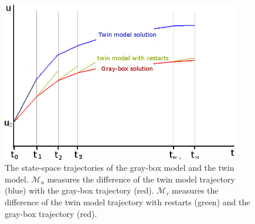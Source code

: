 \begin{figure}[htbp]\begin{center}
    \includegraphics[height=7cm]{../sketch2.png}
    \caption{The state-space trajectories of the gray-box model and the twin model. 
             $\mathcal{M}_u$ measures the difference of the twin model trajectory (blue) with
             the gray-box trajectory (red). $\mathcal{M}_{\tau}$ measures the difference of the
             twin model trajectory with restarts (green) and the gray-box trajectory (red).}
    \label{fig:sketch}
\end{center}\end{figure}

